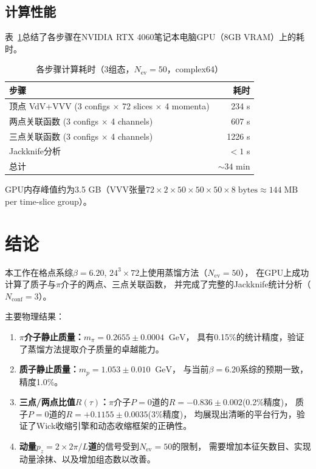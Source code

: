 \documentclass[11pt,a4paper]{article}
\newcommand{\gev}{\;\mathrm{GeV}}
\newcommand{\Nconf}{N_{\mathrm{conf}}}
\newcommand{\Nev}{N_{\mathrm{ev}}}
\begin{document}
\subsection{计算性能}

表~\ref{tab:timing}总结了各步骤在NVIDIA RTX 4060笔记本电脑GPU（8GB VRAM）上的耗时。

\begin{table}[htbp]
\centering
\caption{各步骤计算耗时（3组态，$\Nev=50$，complex64）}
\label{tab:timing}
\begin{tabular}{lr}
\toprule
步骤 & 耗时 \\
\midrule
顶点 VdV+VVV (3 configs $\times$ 72 slices $\times$ 4 momenta) & 234 s \\
两点关联函数 (3 configs $\times$ 4 channels) & 607 s \\
三点关联函数 (3 configs $\times$ 4 channels) & 1226 s \\
Jackknife分析 & $<1$ s \\
\bottomrule
总计 & $\sim 34$ min \\
\bottomrule
\end{tabular}
\end{table}

GPU内存峰值约为3.5 GB（VVV张量$72\times 2\times 50\times 50\times 50\times 8\;\text{bytes}
\approx 144\;\text{MB}$ per time-slice group）。

\section{结论}

本工作在格点系综$\beta=6.20$, $24^3\times 72$上使用蒸馏方法（$\Nev=50$），
在GPU上成功计算了质子与$\pi$介子的两点、三点关联函数，
并完成了完整的Jackknife统计分析（$\Nconf=3$）。

主要物理结果：

\begin{enumerate}[leftmargin=*]
\item \textbf{$\pi$介子静止质量：}$m_\pi = 0.2655\pm 0.0004\;\gev$，
具有0.15\%的统计精度，验证了蒸馏方法提取介子质量的卓越能力。
\item \textbf{质子静止质量：}$m_p = 1.053\pm 0.010\;\gev$，
与当前$\beta=6.20$系综的预期一致，精度1.0\%。
\item \textbf{三点/两点比值$R(\tau)$：}$\pi$介子$P=0$道的$R=-0.836\pm 0.002$(0.2\%精度)，
质子$P=0$道的$R=+0.1155\pm 0.0035$(3\%精度)，
均展现出清晰的平台行为，验证了Wick收缩引擎和动态收缩框架的正确性。
\item \textbf{动量$p_z=2\times 2\pi/L$道}的信号受到$\Nev=50$的限制，
需要增加本征矢数目、实现动量涂抹、以及增加组态数以改善。
\end{enumerate}
\end{document}
